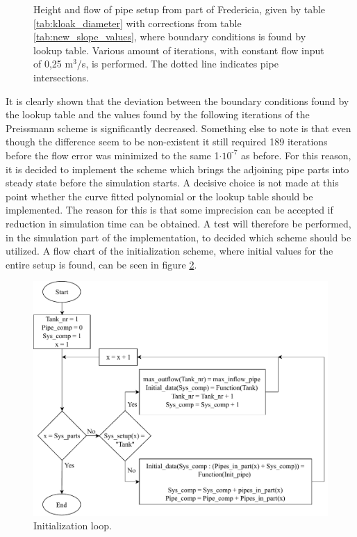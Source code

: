 \begin{figure}[H]
 \centering
 
\caption{Height and flow of pipe setup from part of Fredericia, given by table \ref{tab:kloak_diameter} with corrections from table \ref{tab:new_slope_values}, where boundary conditions is found by lookup table. Various amount of iterations, with constant flow input of 0,25 $\text{m}^\text{3}$/s, is performed. The dotted line indicates pipe intersections.}
\label{fig:fredericia_init_steady_state_lut}
\end{figure}

It is clearly shown that the deviation between the boundary conditions found by the lookup table and the values found by the following iterations of the Preissmann scheme is significantly decreased.
Something else to note is that even though the difference seem to be non-existent it still required 189 iterations before the flow error was minimized to the same 1$\cdot \text{10}^{\text{-7}}$ as before. For this reason, it is decided to implement the scheme which brings the adjoining pipe parts into steady state before the simulation starts. A decisive choice is not made at this point whether the curve fitted polynomial or the lookup table should be implemented. The reason for this is that some imprecision can be accepted if reduction in simulation time can be obtained. A test will therefore be performed, in the simulation part of the implementation, to decided which scheme should be utilized. A flow chart of the initialization scheme, where initial values for the entire setup is found, can be seen in figure \ref{fig:init_sys_dia}.

\begin{figure}[H]
\centering
\includegraphics[width=1.05 \textwidth]{report/simulation/pictures/init_sys_dia.pdf}
\caption{Initialization loop.}
\label{fig:init_sys_dia}
\end{figure}


